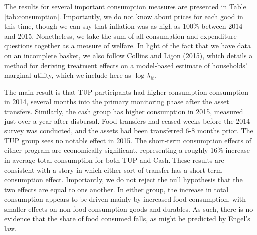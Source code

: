 \documentclass[12pt,article]{article}
\begin{document}
The results for several important consumption measures are presented in Table
\ref{tab:consumption}. Importantly, we do not know about prices for each good in this
time, though we can say that inflation was as high as 100\% between 2014 and 2015.
Nonetheless, we take the sum of all consumption and expenditure questions together as
a measure of welfare. In light of the fact that we have data on an incomplete basket, we also
follow Collins and Ligon (2015), which details a method for deriving treatment
effects on a model-based estimate of households' marginal utility, which we include
here as \(\log\lambda_{it}\).

The main result is that TUP participants had higher consumption consumption in 2014,
several months into the primary monitoring phase after the asset transfers.
Similarly, the cash group has higher consumption in 2015, measured just over a year
after disbursal. Food transfers had ceased weeks before the 2014 survey was
conducted, and the assets had been transferred 6-8 months prior. The TUP group sees
no notable effect in 2015. The short-term consumption effects of either program are
economically significant, representing a roughly 16\% increase in average total
consumption for both TUP and Cash. These results are consistent with a story in which
either sort of transfer has a short-term consumption effect. Importantly, we do not
reject the null hypothesis that the two effects are equal to one another. In either
group, the increase in total consumption appears to be driven mainly by increased
food consumption, with smaller effects on non-food consumption goods and durables. As
such, there is no evidence that the share of food consumed falls, as might be
predicted by Engel's law.

\newpage
\end{document}
